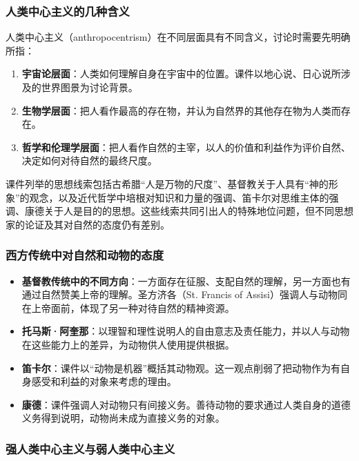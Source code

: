 \documentclass{ctexart}
\begin{document}
\subsubsection{人类中心主义的几种含义}

人类中心主义（anthropocentrism）在不同层面具有不同含义，讨论时需要先明确所指：

\begin{enumerate}
    \item \textbf{宇宙论层面}：人类如何理解自身在宇宙中的位置。课件以地心说、日心说所涉及的世界图景为讨论背景。
    \item \textbf{生物学层面}：把人看作最高的存在物，并认为自然界的其他存在物为人类而存在。
    \item \textbf{哲学和伦理学层面}：把人看作自然的主宰，以人的价值和利益作为评价自然、决定如何对待自然的最终尺度。
\end{enumerate}

课件列举的思想线索包括古希腊“人是万物的尺度”、基督教关于人具有“神的形象”的观念，以及近代哲学中培根对知识和力量的强调、笛卡尔对思维主体的强调、康德关于人是目的的思想。这些线索共同引出人的特殊地位问题，但不同思想家的论证及其对自然的态度仍有差别。

\subsubsection{西方传统中对自然和动物的态度}

\begin{itemize}
    \item \textbf{基督教传统中的不同方向}：一方面存在征服、支配自然的理解，另一方面也有通过自然赞美上帝的理解。圣方济各（St. Francis of Assisi）强调人与动物同在上帝面前，体现了另一种对待自然的精神资源。
    \item \textbf{托马斯·阿奎那}：以理智和理性说明人的自由意志及责任能力，并以人与动物在这些能力上的差异，为动物供人使用提供根据。
    \item \textbf{笛卡尔}：课件以“动物是机器”概括其动物观。这一观点削弱了把动物作为有自身感受和利益的对象来考虑的理由。
    \item \textbf{康德}：课件强调人对动物只有间接义务。善待动物的要求通过人类自身的道德义务得到说明，动物尚未成为直接义务的对象。
\end{itemize}

\subsubsection{强人类中心主义与弱人类中心主义}
\end{document}
